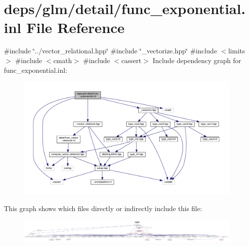 \hypertarget{func__exponential_8inl}{}\section{deps/glm/detail/func\+\_\+exponential.inl File Reference}
\label{func__exponential_8inl}
{\ttfamily \#include \char`\"{}../vector\+\_\+relational.\+hpp\char`\"{}}\newline
{\ttfamily \#include \char`\"{}\+\_\+vectorize.\+hpp\char`\"{}}\newline
{\ttfamily \#include $<$limits$>$}\newline
{\ttfamily \#include $<$cmath$>$}\newline
{\ttfamily \#include $<$cassert$>$}\newline
Include dependency graph for func\+\_\+exponential.\+inl\+:
\nopagebreak
\begin{figure}[H]
\begin{center}
\leavevmode
\includegraphics[width=350pt]{de/dfe/func__exponential_8inl__incl}
\end{center}
\end{figure}
This graph shows which files directly or indirectly include this file\+:
\nopagebreak
\begin{figure}[H]
\begin{center}
\leavevmode
\includegraphics[width=350pt]{d3/dcc/func__exponential_8inl__dep__incl}
\end{center}
\end{figure}
